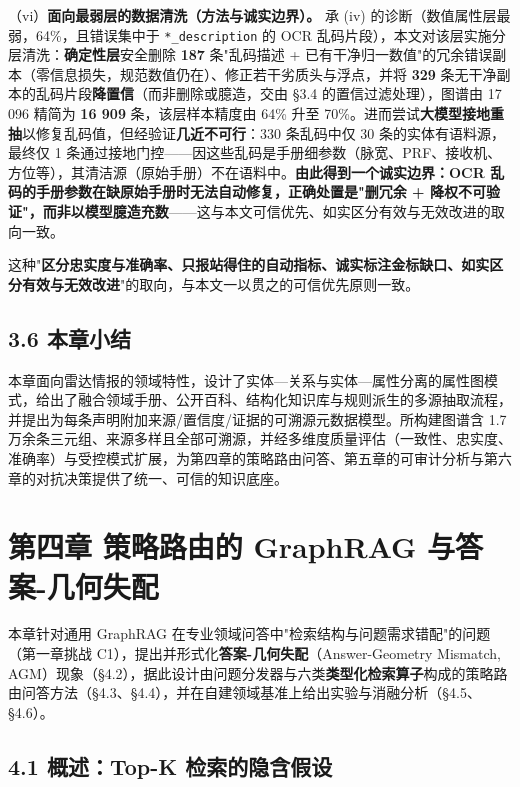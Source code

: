 \documentclass[12pt,a4paper]{ctexart}
\begin{document}
（vi）\textbf{面向最弱层的数据清洗（方法与诚实边界）。} 承 (iv) 的诊断（数值属性层最弱，64\%，且错误集中于 \texttt{*\_description} 的 OCR 乱码片段），本文对该层实施分层清洗：\textbf{确定性层}安全删除 \textbf{187} 条"乱码描述 + 已有干净归一数值"的冗余错误副本（零信息损失，规范数值仍在）、修正若干劣质头与浮点，并将 \textbf{329} 条无干净副本的乱码片段\textbf{降置信}（而非删除或臆造，交由 §3.4 的置信过滤处理），图谱由 17 096 精简为 \textbf{16 909} 条，该层样本精度由 64\% 升至 70\%。进而尝试\textbf{大模型接地重抽}以修复乱码值，但经验证\textbf{几近不可行}：330 条乱码中仅 30 条的实体有语料源，最终仅 1 条通过接地门控——因这些乱码是手册细参数（脉宽、PRF、接收机、方位等），其清洁源（原始手册）不在语料中。\textbf{由此得到一个诚实边界：OCR 乱码的手册参数在缺原始手册时无法自动修复，正确处置是"删冗余 + 降权不可验证"，而非以模型臆造充数}——这与本文可信优先、如实区分有效与无效改进的取向一致。

这种"\textbf{区分忠实度与准确率、只报站得住的自动指标、诚实标注金标缺口、如实区分有效与无效改进}"的取向，与本文一以贯之的可信优先原则一致。

\subsection*{3.6 本章小结}

本章面向雷达情报的领域特性，设计了实体—关系与实体—属性分离的属性图模式，给出了融合领域手册、公开百科、结构化知识库与规则派生的多源抽取流程，并提出为每条声明附加来源/置信度/证据的可溯源元数据模型。所构建图谱含 1.7 万余条三元组、来源多样且全部可溯源，并经多维度质量评估（一致性、忠实度、准确率）与受控模式扩展，为第四章的策略路由问答、第五章的可审计分析与第六章的对抗决策提供了统一、可信的知识底座。



\section*{第四章 策略路由的 GraphRAG 与答案-几何失配}

本章针对通用 GraphRAG 在专业领域问答中"检索结构与问题需求错配"的问题（第一章挑战 C1），提出并形式化\textbf{答案-几何失配}（Answer-Geometry Mismatch, AGM）现象（§4.2），据此设计由问题分发器与六类\textbf{类型化检索算子}构成的策略路由问答方法（§4.3、§4.4），并在自建领域基准上给出实验与消融分析（§4.5、§4.6）。

\subsection*{4.1 概述：Top-K 检索的隐含假设}
\end{document}
